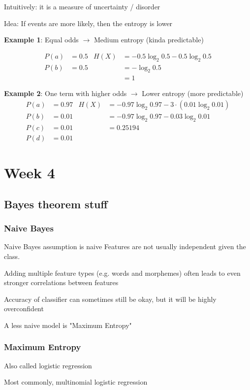 \documentclass{article}
\begin{document}
Intuitively: it is a measure of uncertainty / disorder

Idea: If events are more likely, then the entropy is lower

\textbf{Example 1}: Equal odds $\to$ Medium entropy (kinda predictable)

\begin{align*}
    P(a) &= 0.5 & H(X) &= -0.5 \log_{2} 0.5 - 0.5\log_{2} 0.5 \\
    P(b) &= 0.5 & &= -\log_{2} 0.5\\
         & & &= 1
\end{align*}

\textbf{Example 2}: One term with higher odds $\to$ Lower entropy (more predictable)
\begin{align*}
    P(a) &= 0.97 & H(X) &= -0.97 \log_{2} 0.97 - 3 \cdot (0.01\log_{2} 0.01) \\
    P(b) &= 0.01 & &= -0.97 \log_{2} 0.97 - 0.03\log_{2} 0.01 \\
    P(c) &= 0.01 & &= 0.25194 \\
    P(d) &= 0.01
\end{align*}

\section{Week 4}
\subsection{Bayes theorem stuff}
\subsubsection{Naive Bayes}
Naive Bayes assumption is naive
Features are not usually independent given the class.

Adding multiple feature types (e.g. words and morphemes) often leads to even stronger correlations between features

Accuracy of classifier can sometimes still be okay, but it will be highly overconfident

A less naive model is "Maximum Entropy"

\subsubsection{Maximum Entropy}
Also called logistic regression

Most commonly, multinomial logistic regression
\end{document}
